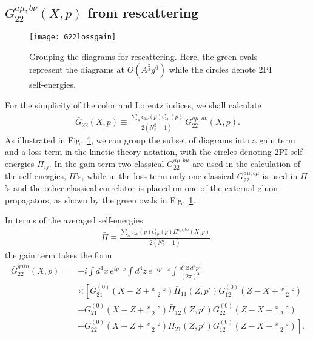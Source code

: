 \documentclass[onecolumn,showpacs,nobibnotes,nofootinbib,12pt,aps,prd,showpacs,notitlepage,nofootinbib,preprintnumbers,amsmath,amssymb]{article}
\def\fig#1{{Fig.~\ref{#1}}}
\begin{document}

\subsection{$G_{22}^{a\mu,b\nu}(X,p)$ from rescattering}
\label{sec:Gresc}

\begin{figure}
\begin{center}
\texttt{[image: G22lossgain]}
\end{center}
\caption{Grouping the diagrams for rescattering. Here, the green ovals
  represent the diagrams at $O(A^{\frac{2}{3}} g^6)$ while the circles
  denote 2PI self-energies.}
\label{fig:g22lossgain}
\end{figure}

For the simplicity of the color and Lorentz indices, we shall
calculate
\begin{align}
  \bar G_{22}(X,p) \equiv \frac{\sum_\lambda
    \epsilon_{\lambda\nu}(p)\epsilon^*_{\lambda\mu}(p)}{2(N_c^2-1)} \,
  G_{22}^{a\mu,a\nu}(X,p).\label{eq:Gbar}
\end{align}
As illustrated in Fig.~\ref{fig:g22lossgain}, we can group the subset
of diagrams into a gain term and a loss term in the kinetic theory
notation, with the circles denoting 2PI self-energies $\Pi_{ij}$. In
the gain term two classical $G_{22}^{a\mu,b\mu}$ are used in the
calculation of the self-energies, $\Pi$'s, while in the loss term only
one classical $G_{22}^{a\mu,b\mu}$ is used in $\Pi$'s and the other
classical correlator is placed on one of the external gluon
propagators, as shown by the green ovals in \fig{fig:g22lossgain}.

In terms of the averaged self-energies
\begin{align}
  \bar{\Pi}\equiv\frac{\sum_\lambda
    \epsilon_{\lambda\nu}(p)\epsilon^*_{\lambda\mu}(p)
    \Pi^{a\mu,b\nu}(X,p)}{2 (N_c^2-1)},
\end{align}
the gain term takes the form
\begin{align}
  \bar G_{22}^{gain}(X,p)=&-i\int d^4x \, e^{ip\cdot x}\int d^4 z \, e^{-ip'\cdot z}\int\frac{d^4Z \, d^4p'}{(2\pi)^4}\nonumber\\
  &\times\left[ G^{(0)}_{21}\left(X-Z+\frac{x-z}{2}\right)\bar\Pi_{11}\left(Z,p' \right)G^{(0)}_{12}\left(Z-X+\frac{x-z}{2}\right)\right.\nonumber\\
  &\left.+ G^{(0)}_{21}\left(X-Z+\frac{x-z}{2}\right)\bar\Pi_{12}\left(Z,p' \right)G^{(0)}_{22}\left(Z-X+\frac{x-z}{2}\right)\right.\nonumber\\
  &\left.+
    G^{(0)}_{22}\left(X-Z+\frac{x-z}{2}\right)\bar\Pi_{21}\left(Z,p'
    \right)G^{(0)}_{12}\left(Z-X+\frac{x-z}{2}\right)\right]. \label{eq:G22formal}
\end{align}
\end{document}
